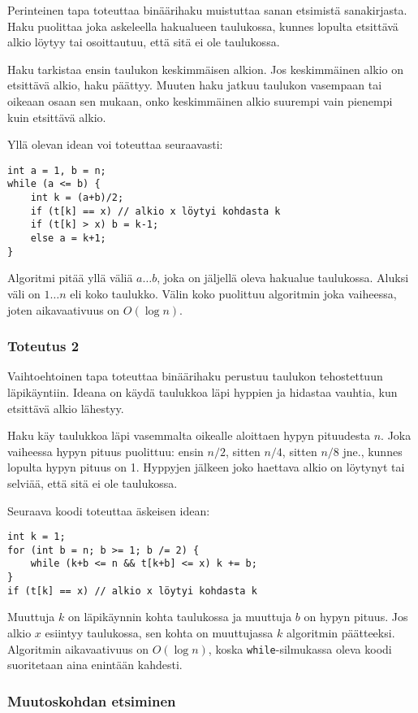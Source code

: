 Perinteinen tapa toteuttaa binäärihaku muistuttaa sanan etsimistä
sanakirjasta. Haku puolittaa joka askeleella hakualueen taulukossa,
kunnes lopulta etsittävä alkio löytyy tai osoittautuu,
että sitä ei ole taulukossa.

Haku tarkistaa ensin taulukon keskimmäisen alkion.
Jos keskimmäinen alkio on etsittävä alkio, haku päättyy.
Muuten haku jatkuu taulukon vasempaan tai oikeaan osaan sen mukaan,
onko keskimmäinen alkio suurempi vain pienempi kuin etsittävä alkio.

Yllä olevan idean voi toteuttaa seuraavasti:
\begin{lstlisting}
int a = 1, b = n;
while (a <= b) {
    int k = (a+b)/2;
    if (t[k] == x) // alkio x löytyi kohdasta k
    if (t[k] > x) b = k-1;
    else a = k+1;
}
\end{lstlisting}

Algoritmi pitää yllä väliä $a \ldots b$, joka on
jäljellä oleva hakualue taulukossa.
Aluksi väli on $1 \ldots n$ eli koko taulukko.
Välin koko puolittuu algoritmin joka vaiheessa,
joten aikavaativuus on $O(\log n)$.

\subsubsection{Toteutus 2}

Vaihtoehtoinen tapa toteuttaa binäärihaku
perustuu taulukon tehostettuun läpikäyntiin.
Ideana on käydä taulukkoa läpi hyppien
ja hidastaa vauhtia, kun etsittävä alkio lähestyy.

Haku käy taulukkoa läpi vasemmalta oikealle aloittaen
hypyn pituudesta $n$.
Joka vaiheessa hypyn pituus puolittuu:
ensin $n/2$, sitten $n/4$, sitten $n/8$ jne.,
kunnes lopulta hypyn pituus on 1.
Hyppyjen jälkeen joko haettava alkio on löytynyt
tai selviää, että sitä ei ole taulukossa.

Seuraava koodi toteuttaa äskeisen idean:
\begin{lstlisting}
int k = 1;
for (int b = n; b >= 1; b /= 2) {
    while (k+b <= n && t[k+b] <= x) k += b;
}
if (t[k] == x) // alkio x löytyi kohdasta k
\end{lstlisting}

Muuttuja $k$ on läpikäynnin kohta taulukossa
ja muuttuja $b$ on hypyn pituus.
Jos alkio $x$ esiintyy taulukossa,
sen kohta on muuttujassa $k$ algoritmin päätteeksi.
Algoritmin aikavaativuus on $O(\log n)$,
koska \texttt{while}-silmukassa oleva koodi suoritetaan
aina enintään kahdesti.

\subsubsection{Muutoskohdan etsiminen}

